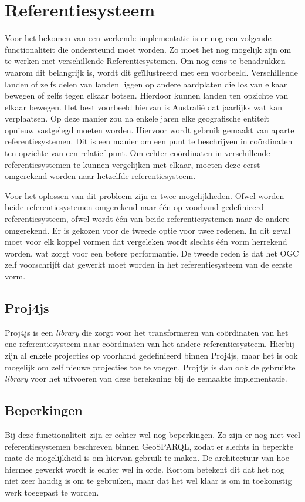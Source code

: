 \section{Referentiesysteem}
\label{sec:projecties}
Voor het bekomen van een werkende implementatie is er nog een volgende functionaliteit die ondersteund moet worden. Zo moet het nog mogelijk zijn om te werken met verschillende Referentiesystemen. Om nog eens te benadrukken waarom dit belangrijk is, wordt dit geïllustreerd met een voorbeeld. Verschillende landen of zelfs delen van landen liggen op andere aardplaten die los van elkaar bewegen of zelfs tegen elkaar botsen. Hierdoor kunnen landen ten opzichte van elkaar bewegen. Het best voorbeeld hiervan is Australië dat jaarlijks wat kan verplaatsen. Op deze manier zou na enkele jaren elke geografische entiteit opnieuw vastgelegd moeten worden. Hiervoor wordt gebruik gemaakt van aparte referentiesystemen. Dit is een manier om een punt te beschrijven in coördinaten ten opzichte van een relatief punt. Om echter coördinaten in verschillende referentiesystemen te kunnen vergelijken met elkaar, moeten deze eerst omgerekend worden naar hetzelfde referentiesysteem.

Voor het oplossen van dit probleem zijn er twee mogelijkheden. Ofwel worden beide referentiesystemen omgerekend naar één op voorhand gedefinieerd referentiesysteem, ofwel wordt één van beide referentiesystemen naar de andere omgerekend. Er is gekozen voor de tweede optie voor twee redenen. In dit geval moet voor elk koppel vormen dat vergeleken wordt slechts één vorm herrekend worden, wat zorgt voor een betere performantie. De tweede reden is dat het OGC zelf voorschrijft dat gewerkt moet worden in het referentiesysteem van de eerste vorm.

\subsection{Proj4js}
Proj4js is een \textit{library} die zorgt voor het transformeren van coördinaten van het ene referentiesysteem naar coördinaten van het andere referentiesysteem. Hierbij zijn al enkele projecties op voorhand gedefinieerd binnen Proj4js, maar het is ook mogelijk om zelf nieuwe projecties toe te voegen. Proj4js is dan ook de gebruikte \textit{library} voor het uitvoeren van deze berekening bij de gemaakte implementatie.

\subsection{Beperkingen}
Bij deze functionaliteit zijn er echter wel nog beperkingen. Zo zijn er nog niet veel referentiesystemen beschreven binnen GeoSPARQL, zodat er slechts in beperkte mate de mogelijkheid is om hiervan gebruik te maken. De architectuur van hoe hiermee gewerkt wordt is echter wel in orde. Kortom betekent dit dat het nog niet zeer handig is om te gebruiken, maar dat het wel klaar is om in toekomstig werk toegepast te worden.